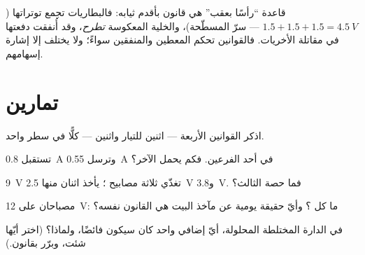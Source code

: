 \begin{remark}\label{rem:g8:circuit-laws:batteries}
قاعدة ``رأسًا بعقب'' هي قانون   بأقدم ثيابه:
فالبطاريات  تجمع توتراتها ($1.5 + 1.5 + 1.5 =
\qty{4.5}{V}$ --- سرّ  المسطّحة)، والخلية المعكوسة
\emph{تطرح}، وقد أُنفقت دفعتها في مقاتلة الأخريات. فالقوانين
تحكم المعطين والمنفقين سواءً؛ ولا يختلف إلا إشارة إسهامهم.
\end{remark}

\section{تمارين}

\begin{exercise}[$\star$]\label{exo:g8:circuit-laws:1}
اذكر القوانين الأربعة --- اثنين للتيار واثنين  --- كلًّا
في سطر واحد.
\end{exercise}

\begin{exercise}[$\star$]\label{exo:g8:circuit-laws:2}
 تستقبل \qty{0.8}{A} وترسل \qty{0.55}{A} في أحد الفرعين.
فكم يحمل  الآخر؟
\end{exercise}

\begin{exercise}[$\star$]\label{exo:g8:circuit-laws:3}
 \qty{9}{V} تغذّي ثلاثة مصابيح ؛ يأخذ اثنان
منها \qty{2.5}{V} و\qty{3.8}{V}. فما حصة الثالث؟
\end{exercise}

\begin{exercise}[$\star$]\label{exo:g8:circuit-laws:4}
مصباحان  على  \qty{12}{V}: ما  كل ؟
وأيّ حقيقة يومية عن مآخذ البيت هي القانون نفسه؟
\end{exercise}

\begin{exercise}[$\star$]\label{exo:g8:circuit-laws:5}
في الدارة المختلطة المحلولة، أيّ  إضافي واحد كان سيكون
فائضًا، ولماذا؟ (اختر أيّها شئت، وبرّر بقانون.)
\end{exercise}


